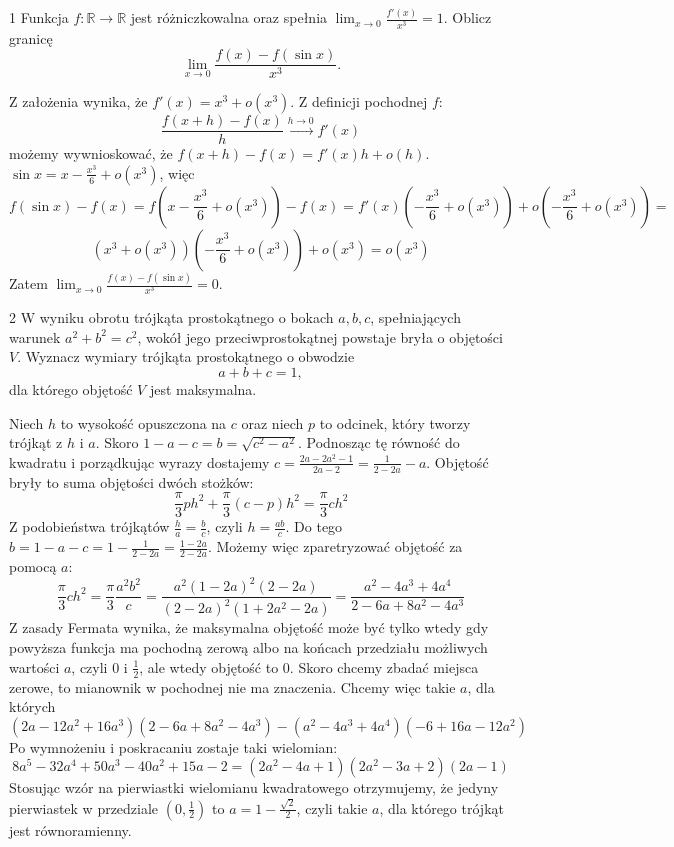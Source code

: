 \documentclass{../note}
\begin{document}
\begin{zadanie}{1}
Funkcja $f : \mathbb{R} \to \mathbb{R}$ jest różniczkowalna oraz spełnia $\lim_{x\to 0} \frac{f'(x)}{x^3} = 1$. Oblicz granicę
\[ \lim_{x\to 0} \frac{f(x) - f(\sin x)}{x^3}. \]
\end{zadanie}
\begin{rozwiazanie}
Z założenia wynika, że $f'(x) = x^3 + o(x^3)$. Z definicji pochodnej $f$:
\[\frac{f(x+h) - f(x)}{h} \xrightarrow{h\to0} f'(x)\]
możemy wywnioskować, że $f(x + h) - f(x) = f'(x)h + o(h)$. $\sin x = x - \frac{x^3}{6} + o(x^3)$, więc
\[f(\sin x) - f(x) = f\left(x - \frac{x^3}{6} + o(x^3)\right) - f(x) = f'(x)\left(- \frac{x^3}{6} + o(x^3)\right) + o\left(- \frac{x^3}{6} + o(x^3)\right) =\]\[ \left(x^3 + o(x^3)\right)\left(- \frac{x^3}{6} + o(x^3)\right) + o(x^3) = o(x^3)\]
Zatem $\lim_{x\to 0} \frac{f(x) - f(\sin x)}{x^3} = 0$.
\end{rozwiazanie}

\begin{zadanie}{2}
W wyniku obrotu trójkąta prostokątnego o bokach $a, b, c$, spełniających warunek $a^2 + b^2 = c^2$, wokół jego przeciwprostokątnej powstaje bryła o objętości $V$.
Wyznacz wymiary trójkąta prostokątnego o obwodzie
\[ a + b + c = 1, \]
dla którego objętość $V$ jest maksymalna.
\end{zadanie}
\begin{rozwiazanie}
Niech $h$ to wysokość opuszczona na $c$ oraz niech $p$ to odcinek, który tworzy trójkąt z $h$ i $a$. Skoro $1 - a - c = b = \sqrt{c^2 - a^2}$. Podnosząc tę równość do kwadratu i porządkując wyrazy dostajemy $c = \frac{2a - 2a^2 - 1}{2a - 2} = \frac{1}{2-2a} - a$. Objętość bryły to suma objętości dwóch stożków:
\[\frac{\pi}{3} ph^2 + \frac{\pi}{3} (c-p)h^2 = \frac{\pi}{3} ch^2\]
Z podobieństwa trójkątów $\frac{h}{a} = \frac{b}{c}$, czyli $h = \frac{ab}{c}$. Do tego $b = 1 - a - c = 1 - \frac{1}{2-2a} = \frac{1-2a}{2-2a}$. Możemy więc zparetryzować objętość za pomocą $a$:
\[\frac{\pi}{3} ch^2 = \frac{\pi}{3} \frac{a^2b^2}{c} = \frac{a^2(1-2a)^2(2-2a)}{(2-2a)^2(1+2a^2-2a)} = \frac{a^2-4a^3+4a^4}{2-6a+8a^2-4a^3}\]
Z zasady Fermata wynika, że maksymalna objętość może być tylko wtedy gdy powyższa funkcja ma pochodną zerową albo na końcach przedziału możliwych wartości $a$, czyli 0 i $\frac12$, ale wtedy objętość to 0. Skoro chcemy zbadać miejsca zerowe, to mianownik w pochodnej nie ma znaczenia. Chcemy więc takie $a$, dla których
\[(2a-12a^2+16a^3)(2-6a+8a^2-4a^3)-(a^2-4a^3+4a^4)(-6+16a-12a^2)\]
Po wymnożeniu i poskracaniu zostaje taki wielomian:
\[8a^5-32a^4+50a^3-40a^2+15a-2=(2a^2-4a+1)(2a^2-3a+2)(2a-1)\]
Stosując wzór na pierwiastki wielomianu kwadratowego otrzymujemy, że jedyny pierwiastek w przedziale $(0, \frac12)$ to $a=1-\frac{\sqrt2}{2}$, czyli takie $a$, dla którego trójkąt jest równoramienny.
\end{rozwiazanie}
\end{document}
